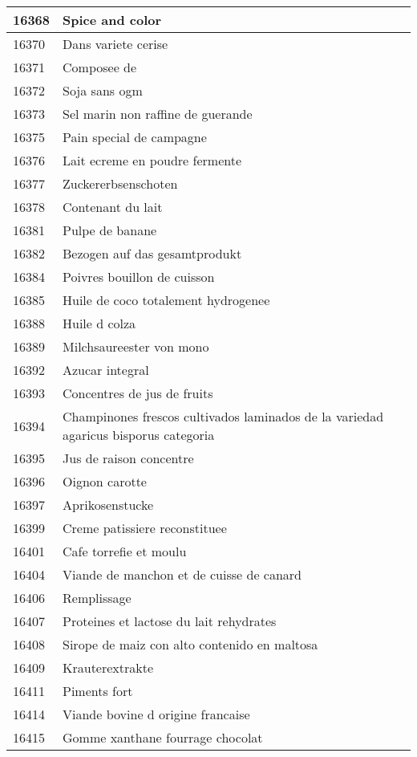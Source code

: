 \begin{longtable}{|l|l|}
16368 & Spice and color \\ \hline 
16370 & Dans variete cerise \\ \hline 
16371 & Composee de \\ \hline 
16372 & Soja sans ogm \\ \hline 
16373 & Sel marin non raffine de guerande \\ \hline 
16375 & Pain special de campagne \\ \hline 
16376 & Lait ecreme en poudre fermente \\ \hline 
16377 & Zuckererbsenschoten \\ \hline 
16378 & Contenant du lait \\ \hline 
16381 & Pulpe de banane \\ \hline 
16382 & Bezogen auf das gesamtprodukt \\ \hline 
16384 & Poivres bouillon de cuisson \\ \hline 
16385 & Huile de coco totalement hydrogenee \\ \hline 
16388 & Huile d colza \\ \hline 
16389 & Milchsaureester von mono \\ \hline 
16392 & Azucar integral \\ \hline 
16393 & Concentres de jus de fruits \\ \hline 
16394 & Champinones frescos cultivados laminados de la variedad agaricus bisporus categoria \\ \hline 
16395 & Jus de raison concentre \\ \hline 
16396 & Oignon carotte \\ \hline 
16397 & Aprikosenstucke \\ \hline 
16399 & Creme patissiere reconstituee \\ \hline 
16401 & Cafe torrefie et moulu \\ \hline 
16404 & Viande de manchon et de cuisse de canard \\ \hline 
16406 & Remplissage \\ \hline 
16407 & Proteines et lactose du lait rehydrates \\ \hline 
16408 & Sirope de maiz con alto contenido en maltosa \\ \hline 
16409 & Krauterextrakte \\ \hline 
16411 & Piments fort \\ \hline 
16414 & Viande bovine d origine francaise \\ \hline 
16415 & Gomme xanthane fourrage chocolat \\ \hline 

\end{longtable}
